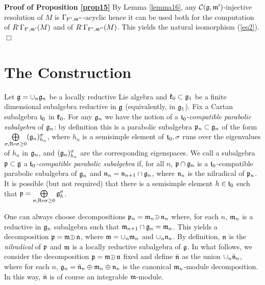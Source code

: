 \documentclass[12pt]{article}
\newcommand{\refle}[1]{Lemma \ref{#1}}
\newcommand{\refprop}[1]{Proposition \ref{#1}}
\newcommand{\refeq}[1]{(\ref{#1})}
\newcommand{\qed}{$\Box$}
\def\crplus{\hbox{$\supset${\raise1.05pt\hbox{\kern -0.72em ${\scriptscriptstyle +}$}}\ }}
\begin{document}
\textbf{Proof of \refprop{prop15}}  By \refle{lemma16}, any $\mathcal{C}(\frak g, \frak m')$-injective resolution of $M$ is $\Gamma_{\frak k'',\frak m''}$-acyclic hence it can be used both for the computation of $R^\cdot\Gamma_{\frak k',\frak m'}(M)$ and of $R^\cdot\Gamma_{\frak k'',\frak m''}(M)$.  This yields the natural isomorphism \refeq{eq2}. \qed
\medskip

\section{The Construction}\label{sec3}

Let $\frak g = \cup_n\frak g_n$ be a locally reductive Lie algebra and $\frak k_0\subset\frak g_1$ be a finite dimensional subalgebra reductive in $\frak g$ (equivalently, in $\frak g_1$). Fix a Cartan subalgebra $\frak t_0$ in $\frak k_0$. For any $\frak g_n$ we have the notion of a $\frak t_0$-{\it compatible parabolic subalgebra} of $\frak g_n$: by definition this is a parabolic subalgebra $\frak p_n\subset\frak g_n$ of the form $\bigoplus\limits_{\sigma,\text{Re} \sigma\geq 0} (\frak g_n)^\sigma_{h_{n}}$, where $h_n$ is a semisimple element of $\frak t_0,\sigma$ runs over the eigenvalues of $h_n$ in $\frak g_n$, and $(\frak g_n)^\sigma_{h_{n}}$ are the corresponding eigenspaces.  We call a subalgebra $\frak p\subset\frak g$ a {\it $\frak t_0$-compatible parabolic subalgebra} if, for all $n$, $\frak p\cap\frak g_n$ is a $\frak t_0$-compatible parabolic subalgebra of $\frak g_n$ and $\frak n_n = \frak n_{n+1}\cap\frak g_n$, where $\frak n_n$ is the nilradical of $\frak p_n$.  It is possible (but not required) that there is a semisimple element $h\in \frak t_0$ such that $\frak p = \bigoplus\limits_{\sigma, \text{Re} \sigma\geq 0} \frak g^\sigma_h$.

One can always choose decompositions $\frak p_n = \frak m_n \crplus \frak n_n$ where, for each $n$, $\frak m_n$ is a reductive in $\frak g_n$ subalgebra such that $\frak m_{n+1} \cap\frak g_n = \frak m_n$.  This yields a decomposition $\frak p = \frak m\crplus \frak n$, where $\frak m = \cup_n \frak m_n$ and $\cup_n\frak n_n$. By definition, $\frak n$ is the {\it nilradical} of $\frak p$ and $\frak m$ is a locally reductive subalgebra of $\frak g$.  In what follows, we consider the decomposition $\frak p = \frak m\crplus \frak n$ fixed and define $\bar{\frak n}$ as the union $\cup_n {\bar{{\frak n}}}_n$, where for each $n$, $\frak g_n = {\bar{{\frak n}}}_n\oplus \frak m_n\oplus{\frak n}_n$ is the canonical ${\frak m}_n$-module decomposition.  In this way, $\bar{\frak n}$ is of course an integrable $\frak m$-module.
\end{document}
